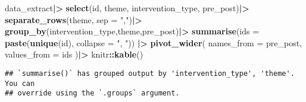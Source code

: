\documentclass[
]{article}
\newenvironment{Shaded}{\begin{snugshade}}{\end{snugshade}}
\newcommand{\AttributeTok}[1]{\textcolor[rgb]{0.13,0.29,0.53}{#1}}
\newcommand{\FunctionTok}[1]{\textcolor[rgb]{0.13,0.29,0.53}{\textbf{#1}}}
\newcommand{\NormalTok}[1]{#1}
\newcommand{\SpecialCharTok}[1]{\textcolor[rgb]{0.81,0.36,0.00}{\textbf{#1}}}
\newcommand{\StringTok}[1]{\textcolor[rgb]{0.31,0.60,0.02}{#1}}
\begin{document}
\begin{Shaded}
\begin{Highlighting}[]
\NormalTok{data\_extract}\SpecialCharTok{|\textgreater{}}
  \FunctionTok{select}\NormalTok{(id, theme, intervention\_type, pre\_post)}\SpecialCharTok{|\textgreater{}}
  \FunctionTok{separate\_rows}\NormalTok{(theme, }\AttributeTok{sep =} \StringTok{","}\NormalTok{)}\SpecialCharTok{|\textgreater{}}
  \FunctionTok{group\_by}\NormalTok{(intervention\_type,theme,pre\_post)}\SpecialCharTok{|\textgreater{}}
  \FunctionTok{summarise}\NormalTok{(}\AttributeTok{ids =} \FunctionTok{paste}\NormalTok{(}\FunctionTok{unique}\NormalTok{(id), }\AttributeTok{collapse =} \StringTok{", "}\NormalTok{)) }\SpecialCharTok{|\textgreater{}}
  \FunctionTok{pivot\_wider}\NormalTok{(}
    \AttributeTok{names\_from =}\NormalTok{ pre\_post,}
    \AttributeTok{values\_from =}\NormalTok{ ids}
\NormalTok{  )}\SpecialCharTok{|\textgreater{}}
\NormalTok{  knitr}\SpecialCharTok{::}\FunctionTok{kable}\NormalTok{()}
\end{Highlighting}
\end{Shaded}

\begin{verbatim}
## `summarise()` has grouped output by 'intervention_type', 'theme'. You can
## override using the `.groups` argument.
\end{verbatim}
\end{document}
